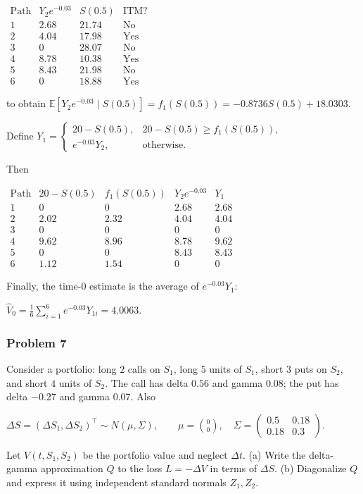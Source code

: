 $\begin{array}{c|ccc}\text{Path}&Y_2e^{-0.03}&S(0.5)&\text{ITM?}\\\hline1&2.68&21.74&\text{No}\\2&4.04&17.98&\text{Yes}\\3&0&28.07&\text{No}\\4&8.78&10.38&\text{Yes}\\5&8.43&21.98&\text{No}\\6&0&18.88&\text{Yes}\end{array}$

to obtain
$\mathbb{E}[Y_2e^{-0.03}\mid S(0.5)]=f_1(S(0.5))=-0.8736S(0.5)+18.0303$.

Define
$Y_1=\begin{cases}20-S(0.5),&20-S(0.5)\geq f_1(S(0.5)),\\e^{-0.03}Y_2,&\text{otherwise}.\end{cases}$

Then

$\begin{array}{c|ccc|c}\text{Path}&20-S(0.5)&f_1(S(0.5))&Y_2e^{-0.03}&Y_1\\\hline1&0&0&2.68&2.68\\2&2.02&2.32&4.04&4.04\\3&0&0&0&0\\4&9.62&8.96&8.78&9.62\\5&0&0&8.43&8.43\\6&1.12&1.54&0&0\end{array}$

Finally, the time-$0$ estimate is the average of $e^{-0.03}Y_1$:

$\widehat V_0=\frac16\sum_{i=1}^6e^{-0.03}Y_{1i}=4.0063$.

\subsubsection*{Problem 7}

 Consider a portfolio: long $2$ calls on $S_1$, long $5$ units of $S_1$, short $3$ puts on $S_2$, and short $4$ units of $S_2$. The call has delta $0.56$ and gamma $0.08$; the put has delta $-0.27$ and gamma $0.07$. Also

$\Delta S=(\Delta S_1,\Delta S_2)^\top\sim N(\mu,\Sigma),\qquad \mu=\binom00,\quad\Sigma=\begin{pmatrix}0.5&0.18\\0.18&0.3\end{pmatrix}$.

Let $V(t,S_1,S_2)$ be the portfolio value and neglect $\Delta t$. (a) Write the delta-gamma approximation $Q$ to the loss $L=-\Delta V$ in terms of $\Delta S$. (b) Diagonalize $Q$ and express it using independent standard normals $Z_1,Z_2$.

